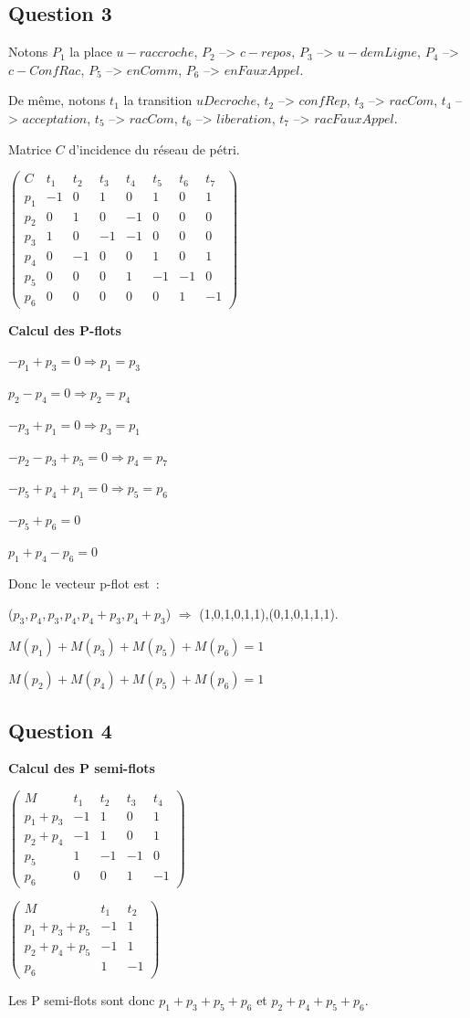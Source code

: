 \subsection*{Question 3}

Notons $P_1$ la place $u-raccroche$, $P_2$ --> $c-repos$, $P_3$ -->
$u-demLigne$, $P_4$ --> $c-ConfRac$, $P_5$ --> $enComm$, $P_6$ -->
$enFauxAppel$.

De même, notons $t_1$ la transition $uDecroche$, $t_2$ --> $confRep$,
$t_3$ --> $racCom$, $t_4$ --> $acceptation$, $t_5$ --> $racCom$, $t_6$
--> $liberation$, $t_7$ --> $racFauxAppel$.

Matrice $C$ d'incidence du réseau de pétri.  

 $ \begin{pmatrix}
C&t_1&t_2&t_3&t_4&t_5&t_6&t_7 \\
p_1& -1&0&1&0&1&0&1 \\
p_2&0&1&0&-1&0&0&0 \\
p_3&1&0&-1&-1&0&0&0 \\
p_4&0&-1&0&0&1&0&1 \\
p_5&0&0&0&1&-1&-1&0 \\
p_6&0&0&0&0&0&1&-1
\end{pmatrix}$


\textbf{Calcul des P-flots}

$-p_1 + p_3=0 \Rightarrow p_1=p_3$

$p_2 - p_4=0 \Rightarrow p_2=p_4$

$-p_3 + p_1=0 \Rightarrow p_3=p_1$

$-p_2 - p_3 + p_5=0 \Rightarrow p_4=p_7$

$-p_5 + p_4 + p_1=0 \Rightarrow p_5=p_6$

$-p_5 + p_6=0$

$ p_1 + p_4 - p_6=0$


Donc le vecteur p-flot est~: 

($p_3,p_4,p_3,p_4,p_4 + p_3,p_4 + p_3$) $\Rightarrow$
(1,0,1,0,1,1),(0,1,0,1,1,1).


$M(p_1)+M(p_3)+M(p_5)+M(p_6)=1$


$M(p_2)+M(p_4)+M(p_5)+M(p_6)=1$

\subsection*{Question 4}

\textbf{Calcul des P semi-flots}

 $ \begin{pmatrix}
M&t_1&t_2&t_3&t_4 \\
p_1+p_3& -1&1&0&1 \\
p_2+p_4&-1&1&0&1 \\
p_5&1&-1&-1&0 \\
p_6&0&0&1&-1
\end{pmatrix}$

 $ \begin{pmatrix}
M&t_1&t_2 \\
p_1+p_3+p_5& -1&1 \\
p_2+p_4+p_5&-1&1 \\
p_6&1&-1
\end{pmatrix}$

Les P semi-flots sont donc $p_1+p_3+p_5+p_6$ et $p_2+p_4+p_5+p_6$.
